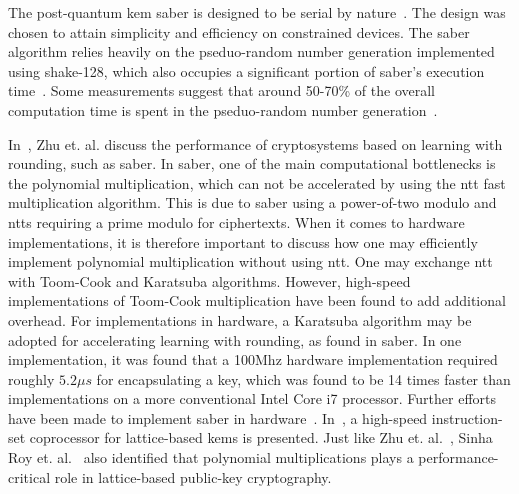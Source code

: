 The \gls{post-quantum} \gls{kem} \gls{saber} is designed to be serial by nature~\cite{sinha2019}. The design was chosen to attain simplicity and efficiency on constrained devices. The \gls{saber} algorithm relies heavily on the pseduo-random number generation implemented using \gls{shake}-128, which also occupies a significant portion of \gls{saber}'s execution time~\cite{sinha2019}. Some measurements suggest that around 50-70\% of the overall computation time is spent in the pseduo-random number generation~\cite{saber}.

In~\cite{zhu2021}, Zhu et. al. discuss the performance of cryptosystems based on learning with rounding, such as \gls{saber}. In \gls{saber}, one of the main computational bottlenecks is the polynomial multiplication, which can not be accelerated by using the \gls{ntt} fast multiplication algorithm. This is due to \gls{saber} using a power-of-two modulo and \glspl{ntt} requiring a prime modulo for ciphertexts. When it comes to hardware implementations, it is therefore important to discuss how one may efficiently implement polynomial multiplication without using \gls{ntt}. One may exchange \gls{ntt} with Toom-Cook and Karatsuba algorithms. However, high-speed implementations of Toom-Cook multiplication have been found to add additional overhead. For implementations in hardware, a Karatsuba algorithm may be adopted for accelerating learning with rounding, as found in \gls{saber}. In one implementation, it was found that a 100Mhz hardware implementation required roughly $5.2\mu s$ for encapsulating a key, which was found to be 14 times faster than implementations on a more conventional Intel Core i7 processor. Further efforts have been made to implement \gls{saber} in hardware~\cite{roy2020}. In~\cite{roy2020}, a high-speed instruction-set coprocessor for lattice-based \glspl{kem} is presented. Just like Zhu et. al.~\cite{zhu2021}, Sinha Roy et. al.~\cite{roy2020} also identified that polynomial multiplications plays a performance-critical role in lattice-based public-key cryptography.


